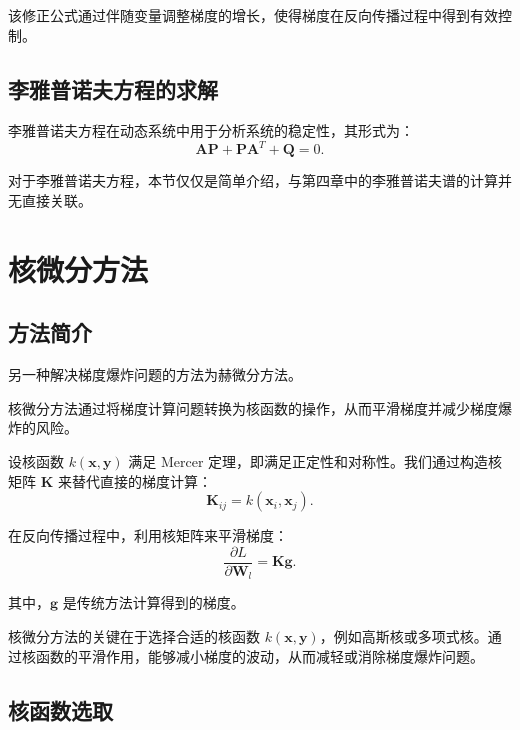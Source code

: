 该修正公式通过伴随变量调整梯度的增长，使得梯度在反向传播过程中得到有效控制。

\subsection{李雅普诺夫方程的求解}

李雅普诺夫方程在动态系统中用于分析系统的稳定性，其形式为：
\begin{equation}
  \mathbf{A} \mathbf{P} + \mathbf{P} \mathbf{A}^T + \mathbf{Q} = 0.
\end{equation}

对于李雅普诺夫方程，本节仅仅是简单介绍，与第四章中的李雅普诺夫谱的计算并无直接关联。

\section{核微分方法}

\subsection{方法简介}

另一种解决梯度爆炸问题的方法为赫微分方法。

核微分方法通过将梯度计算问题转换为核函数的操作，从而平滑梯度并减少梯度爆炸的风险。

设核函数 \(k(\mathbf{x}, \mathbf{y})\) 满足 Mercer 定理，即满足正定性和对称性。我们通过构造核矩阵 \(\mathbf{K}\) 来替代直接的梯度计算：
\begin{equation}
  \mathbf{K}_{ij} = k(\mathbf{x}_i, \mathbf{x}_j).
\end{equation}

在反向传播过程中，利用核矩阵来平滑梯度：
\begin{equation}
  \frac{\partial L}{\partial \mathbf{W}_l} = \mathbf{K} \mathbf{g}.
\end{equation}

其中，\(\mathbf{g}\) 是传统方法计算得到的梯度。

核微分方法的关键在于选择合适的核函数 \(k(\mathbf{x}, \mathbf{y})\)，例如高斯核或多项式核。通过核函数的平滑作用，能够减小梯度的波动，从而减轻或消除梯度爆炸问题。

\subsection{核函数选取}

